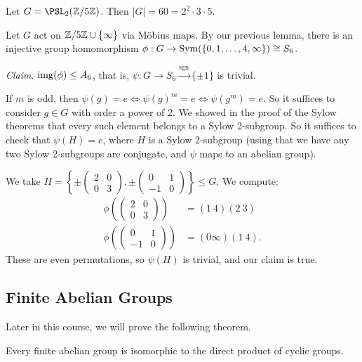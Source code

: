 \documentclass[a4paper]{scrartcl}
\begin{document}
\begin{example}
	Let $G = \PSL_2(\Z/5\Z)$. Then $|G| = 60 = 2^2 \cdot 3 \cdot 5$.

	Let $G$ act on $\mathbb{Z}/5\mathbb{Z} \cup \{\infty\}$ via Möbius maps. By our previous lemma, there is an injective group homomorphism $\phi : G \rightarrow \operatorname{Sym}(\{0, 1, \dots, 4, \infty\}) \cong S_6$.

	\emph{Claim}. $\operatorname{img}(\phi) \leq A_6$, that is, $\psi: G \rightarrow S_6 \xrightarrow{\operatorname{sgn}} \{\pm 1\}$ is trivial.

	If $m$ is odd, then $\psi(g) = e \iff \psi(g)^m = e \iff \psi(g^m) = e$. So it suffices to consider $g \in G$ with order a power of 2. We showed in the proof of the Sylow theorems that every such element belongs to a Sylow 2-subgroup. So it suffices to check that $\psi(H) = e$, where $H$ is a Sylow $2$-subgroup (using that we have any two Sylow $2$-subgroups are conjugate, and $\psi$ maps to an abelian group). 

	We take $H =\left\{ \pm \begin{pmatrix}
		2 & 0 \\ 0 & 3
	\end{pmatrix},\pm \begin{pmatrix}
		0 & 1 \\ -1 & 0 
	\end{pmatrix} \right \} \leq G$. We compute:
	\begin{align*}
		\phi\left(\begin{pmatrix}
			2 & 0 \\ 0 & 3
		\end{pmatrix}\right) &= (1\ 4)(2\ 3)\\
		\phi\left(\begin{pmatrix}
		0 & 1 \\ -1 & 0
		\end{pmatrix}\right) &= (0 \infty)(1\ 4).
	\end{align*} 
	These are even permutations, so $\psi(H)$ is trivial, and our claim is true.
\end{example}

\subsection{Finite Abelian Groups}

Later in this course, we will prove the following theorem.

\begin{theorem}
	Every finite abelian group is isomorphic to the direct product of cyclic groups.
\end{theorem}
\end{document}
